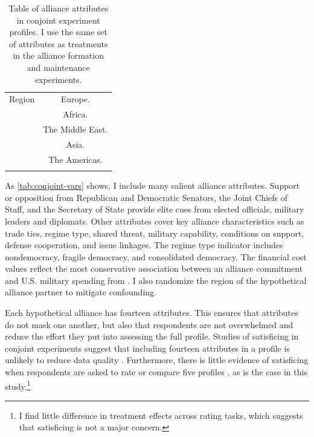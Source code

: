 \documentclass[12pt]{article}
\begin{document}
\begin{table}
\begin{adjustbox}{width = .99\textwidth}
\begin{tabular}{lc}
Region              & Europe. \\ 
                    & Africa. \\
                    & The Middle East. \\ 
                    & Asia. \\   
                    & The Americas. \\ 
                                                                            
\hline \\
\end{tabular}
\end{adjustbox}
\caption{Table of alliance attributes in conjoint experiment profiles. I use the same set of attributes as treatments in the alliance formation and maintenance experiments.} 
\label{tab:conjoint-vars}
\end{table}


As \autoref{tab:conjoint-vars} shows, I include many salient alliance attributes.
Support or opposition from Republican and Democratic Senators, the Joint Chiefs of Staff, and the Secretary of State provide elite cues from elected officials, military leaders and diplomats. 
Other attributes cover key alliance characteristics such as trade ties, regime type, shared threat, military capability, conditions on support, defense cooperation, and issue linkages.
The regime type indicator includes nondemocracy, fragile democracy, and consolidated democracy. 
The financial cost values reflect the most conservative association between an alliance commitment and U.S. military spending from \citet{AlleyFuhrmann2021}. 
I also randomize the region of the hypothetical alliance partner to mitigate confounding.  


Each hypothetical alliance has fourteen attributes.
This ensures that attributes do not mask one another, but also that respondents are not overwhelmed and reduce the effort they put into assessing the full profile.
Studies of satisficing in conjoint experiments suggest that including fourteen attributes in a profile is unlikely to reduce data quality \citep{Bansaketal2019}. 
Furthermore, there is little evidence of satisficing when respondents are asked to rate or compare five profiles \citep{Bansaketal2018}, as is the case in this study.\footnote{I find little difference in treatment effects across rating tasks, which suggests that satisficing is not a major concern.} 
\end{document}
